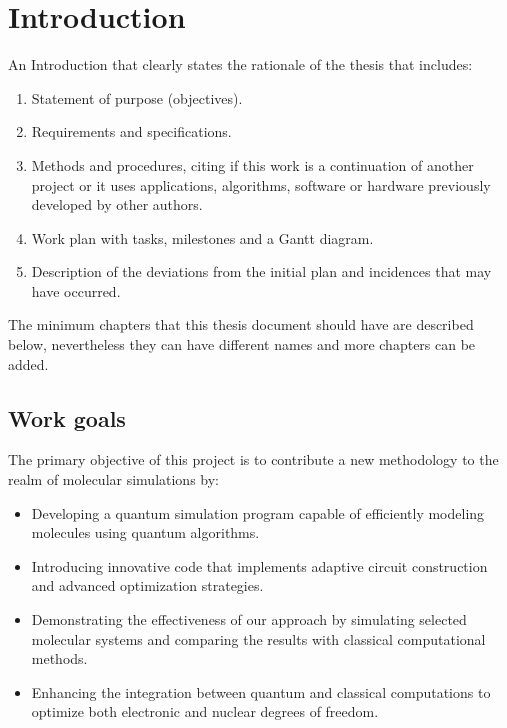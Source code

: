 
\chapter{Introduction}


An Introduction that clearly states the rationale of the thesis that includes:


\begin{enumerate}

  \item Statement of purpose (objectives).

  \item Requirements and specifications.

  \item Methods and procedures, citing if this work is a continuation of another project or it uses applications, algorithms, software or hardware previously developed by other authors.
  
  \item Work plan with tasks, milestones and a Gantt diagram.

  \item Description of the deviations from the initial plan and incidences that may have occurred.
\end{enumerate}
The minimum chapters that this thesis document should have are described below, nevertheless they can have different names and more chapters can be added.

\section{Work goals}
The primary objective of this project is to contribute a new methodology to the realm of molecular simulations by:

\begin{itemize} 
  \item Developing a quantum simulation program capable of efficiently modeling molecules using quantum algorithms. 
  \item Introducing innovative code that implements adaptive circuit construction and advanced optimization strategies. 
  \item Demonstrating the effectiveness of our approach by simulating selected molecular systems and comparing the results with classical computational methods. 
  \item Enhancing the integration between quantum and classical computations to optimize both electronic and nuclear degrees of freedom. 
\end{itemize}

